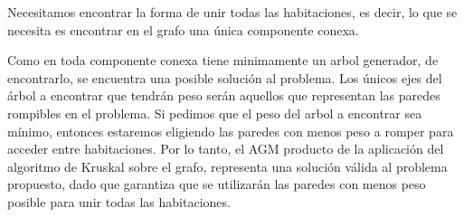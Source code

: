 Necesitamos encontrar la forma de unir todas las habitaciones, es decir, lo que se necesita es encontrar en el grafo una única componente conexa. 

Como en toda componente conexa tiene minimamente un arbol generador, de encontrarlo, se encuentra una posible solución al problema. Los únicos ejes del árbol a encontrar que tendrán peso serán aquellos que representan las paredes rompibles en el problema. Si pedimos que el peso del arbol a encontrar sea mínimo, entonces estaremos eligiendo las paredes con menos peso a romper para acceder entre habitaciones. Por lo tanto, el AGM producto de la aplicación del algoritmo de Kruskal sobre el grafo, representa una solución válida al problema propuesto, dado que garantiza que se utilizarán las paredes con menos peso posible para unir todas las habitaciones.